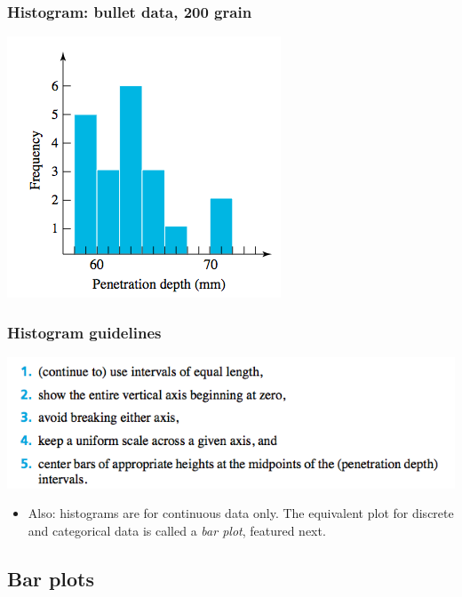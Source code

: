 \documentclass[handout]{beamer}\usepackage{graphicx, color}
\numberwithin{equation}{section}
\begin{document}
\begin{frame}
\frametitle{Histogram: bullet data, 200 grain}
\begin{center}
 \includegraphics{../../fig/bullethist.png}
\end{center}
\end{frame}

\begin{frame}
\frametitle{Histogram guidelines}
 \includegraphics{../../fig/histrules.png}
\begin{itemize}
\pause \item Also: histograms are for continuous data only. The equivalent plot for discrete and categorical data is called a \emph{bar plot}, featured next. 
\end{itemize}
\end{frame}

\subsection{Bar plots}
\end{document}
